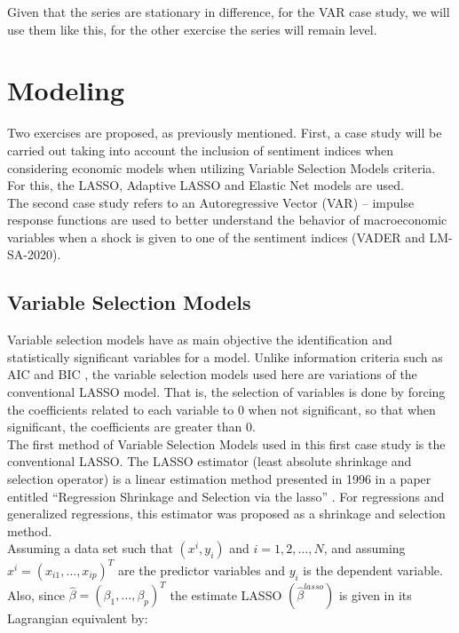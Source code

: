 Given that the series are stationary in difference, for the VAR case study, we will use them like this, for the other exercise the series will remain level.

\section{Modeling}

Two exercises are proposed, as previously mentioned. First, a case study will be carried out taking into account the inclusion of sentiment indices when considering economic models when utilizing Variable Selection Models criteria. For this, the LASSO, Adaptive LASSO and Elastic Net models are used.\\

The second case study refers to an Autoregressive Vector (VAR) -- impulse response functions are used to better understand the behavior of macroeconomic variables when a shock is given to one of the sentiment indices (VADER and LM- SA-2020).\\

\subsection{Variable Selection Models}
\label{sub:selection}

Variable selection models have as main objective the identification and statistically significant variables for a model. Unlike information criteria such as AIC \cite[]{akaike1974new} and BIC \cite[]{schwarz1978estimating}, the variable selection models used here are variations of the conventional LASSO model. That is, the selection of variables is done by forcing the coefficients related to each variable to 0 when not significant, so that when significant, the coefficients are greater than 0.\\

The first method of Variable Selection Models used in this first case study is the conventional LASSO. The LASSO estimator (least absolute shrinkage and selection operator) is a linear estimation method presented in 1996 in a paper entitled ``Regression Shrinkage and Selection via the lasso'' \cite[]{tibshirani1996regression}. For regressions and generalized regressions, this estimator was proposed as a shrinkage and selection method.\\

Assuming a data set such that $(x^i, y_i)$ and $i = 1, 2, \dots , N$, and assuming $x^i = (x_{i1}, \dots, x_{ip})^T$ are the predictor variables and $y_i$ is the dependent variable. Also, since $\hat{\beta} = (\beta_1, \dots, \beta_p)^T$ the estimate LASSO $(\hat{\beta}^{lasso})$ \cite[p. 268]{tibshirani1996regression} is given in its Lagrangian equivalent by:

